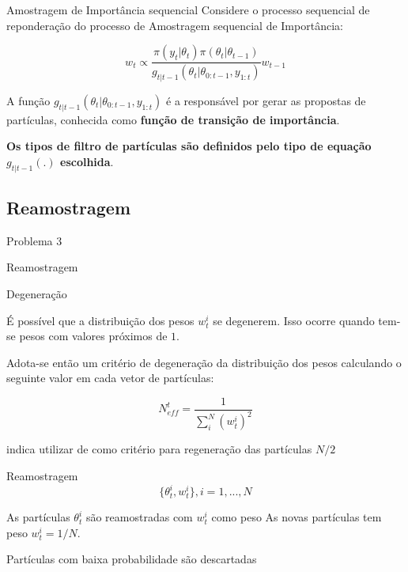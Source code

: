 \documentclass{beamer}
\begin{document}
\begin{frame}{Amostragem de Importância sequencial}
Considere o processo sequencial de reponderação do processo de Amostragem sequencial de Importância:

$$
w_t \propto \frac{\pi(y_t|\theta_t)\pi(\theta_t|\theta_{t-1})}{g_{t|t-1}(\theta_t|\theta_{0:t-1},y_{1:t})} w_{t-1}
$$

\pause

A função $g_{t|t-1}(\theta_t|\theta_{0:t-1},y_{1:t})$ é a responsável por gerar as propostas de partículas, conhecida como \textbf{função de transição de importância}.

\vspace{0.5cm} 

\pause

\textbf{Os tipos de filtro de partículas são definidos pelo tipo de equação $g_{t|t-1}(.)$ escolhida}.

\end{frame}



\subsection{Reamostragem}

\begin{frame}{Problema 3}
    \begin{block}{}
      \Huge  Reamostragem
    \end{block}
\end{frame}


\begin{frame}{Degeneração}

É possível que a distribuição dos pesos $w^i_t$ se degenerem. Isso ocorre quando tem-se pesos com valores próximos de $1$.

\vspace{0.5cm} 
\pause

Adota-se então um critério de degeneração da distribuição dos pesos calculando o seguinte valor em cada vetor de partículas:

$$
N^t_{eff} = \frac{1}{\sum^N_ i{(w_t^{i})^2}}
$$


\pause

\cite{petris} indica utilizar de como critério para regeneração das partículas $N/2$ 

\end{frame}




\begin{frame}{Reamostragem}
$$
\{\theta_t^i,w_t^i\},  i=1,...,N
$$

\pause
\vspace{0.5cm} 
As partículas $\theta^i_t$ são reamostradas com $w^i_t$ como peso
\pause
\vspace{0.5cm} 
As novas partículas tem peso $w^i_t = 1/N$. 
\vspace{0.5cm} 

\pause
Partículas com baixa probabilidade são descartadas

\end{frame}
\end{document}
